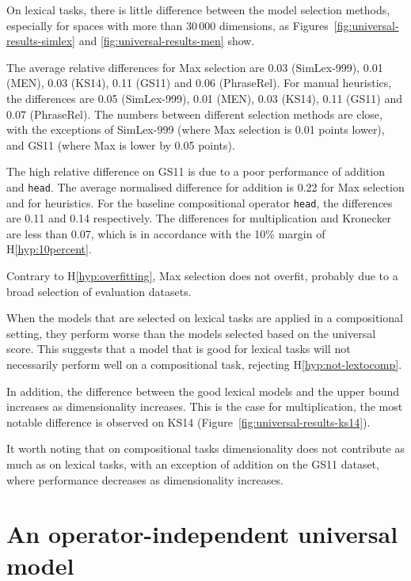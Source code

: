 On lexical tasks, there is little difference between the model selection methods, especially for spaces with more than 30\,000 dimensions, as Figures~\ref{fig:universal-results-simlex} and \ref{fig:universal-results-men} show.

The average relative differences for Max selection are 0.03 (SimLex-999), 0.01 (MEN), 0.03 (KS14), 0.11 (GS11) and 0.06 (PhraseRel). For manual heuristics, the differences are 0.05 (SimLex-999), 0.01 (MEN), 0.03 (KS14), 0.11 (GS11) and 0.07 (PhraseRel). The numbers between different selection methods are close, with the exceptions of SimLex-999 (where Max selection is 0.01 points lower), and GS11 (where Max is lower by 0.05 points).

The high relative difference on GS11 is due to a poor performance of addition and \texttt{head}. The average normalised difference for addition is 0.22 for Max selection and for heuristics. For the baseline compositional operator \texttt{head}, the differences are 0.11 and 0.14 respectively. The differences for multiplication and Kronecker are less than 0.07, which is in accordance with the 10\% margin of H\ref{hyp:10percent}.

Contrary to H\ref{hyp:overfitting}, Max selection does not overfit, probably due to a broad selection of evaluation datasets.

When the models that are selected on lexical tasks are applied in a compositional setting, they perform worse than the models selected based on the universal score. This suggests that a model that is good for lexical tasks will not necessarily perform well on a compositional task, rejecting H\ref{hyp:not-lextocomp}.

In addition, the difference between the good lexical models and the upper bound increases as dimensionality increases. This is the case for multiplication, the most notable difference is observed on KS14 (Figure~\ref{fig:universal-results-ks14}).

It worth noting that on compositional tasks dimensionality does not contribute as much as on lexical tasks, with an exception of addition on the GS11 dataset, where performance decreases as dimensionality increases.

\section{An operator-independent universal model}
\label{sec:single}

